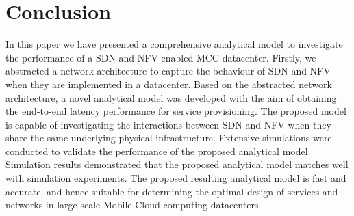 
\section{Conclusion}
\label{sec:conclusions}

In this paper we have presented a comprehensive analytical model to investigate the performance of a SDN and NFV enabled MCC datacenter. Firstly, we abstracted a network architecture to capture the behaviour of SDN and NFV when they are implemented in a datacenter. Based on the abstracted network architecture, a novel analytical model was developed with the aim of obtaining the end-to-end latency performance for service provisioning. The proposed model is capable of investigating the interactions between SDN and NFV when they share the same underlying physical infrastructure. Extensive simulations were conducted to validate the performance of the proposed analytical model. Simulation results demonstrated that the proposed analytical model matches well with simulation experiments. The proposed resulting analytical model is fast and accurate, and hence suitable for determining the optimal design of services and networks in large scale Mobile Cloud computing datacenters.

